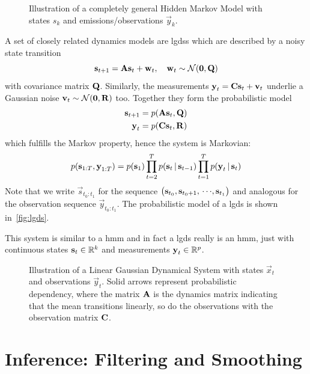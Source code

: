 	\begin{figure}
		\centering
		\tikzHiddenMarkovModel
		\caption{Illustration of a completely general Hidden Markov Model with states \(s_k\) and emis\-sions/observations \(\vec{y}_k\).}
		\label{fig:hiddenMarkovModel}
	\end{figure}

	A set of closely related dynamics models are \acp{lgds} which are described by a noisy state transition
	\begin{equation*}
		\boldsymbol{\mathrm{s}}_{t + 1} = \boldsymbol{\mathrm{A}} \boldsymbol{\mathrm{s}}_t + \boldsymbol{\mathrm{w}}_t,\quad \boldsymbol{\mathrm{w}}_t \sim \mathcal{N}(\boldsymbol{\mathrm{0}}, \boldsymbol{\mathrm{Q}})
	\end{equation*}
	with covariance matrix \(\boldsymbol{\mathrm{Q}}\). Similarly, the measurements \( \boldsymbol{\mathrm{y}}_t = \boldsymbol{\mathrm{C}} \boldsymbol{\mathrm{s}}_t + \boldsymbol{\mathrm{v}}_t \) underlie a Gaussian noise \( \boldsymbol{\mathrm{v}}_t \sim \mathcal{N}(\boldsymbol{\mathrm{0}}, \boldsymbol{\mathrm{R}}) \) too. Together they form the probabilistic model
	\begin{align*}
		\boldsymbol{\mathrm{s}}_{t + 1} &= p(\boldsymbol{\mathrm{A}} \boldsymbol{\mathrm{s}}_t, \boldsymbol{\mathrm{Q}}) \\
		\boldsymbol{\mathrm{y}}_t &= p(\boldsymbol{\mathrm{C}} \boldsymbol{\mathrm{s}}_t, \boldsymbol{\mathrm{R}})
	\end{align*}
	which fulfills the Markov property, hence the system is Markovian:
	\begin{equation*}
		p(\boldsymbol{\mathrm{s}}_{1:T}, \boldsymbol{\mathrm{y}}_{1:T}) = p(\boldsymbol{\mathrm{s}}_1) \prod_{t = 2}^{T} p(\boldsymbol{\mathrm{s}}_t \,\vert\, \boldsymbol{\mathrm{s}}_{t - 1}) \prod_{t = 1}^{T} p(\boldsymbol{\mathrm{y}}_t \,\vert\, \boldsymbol{\mathrm{s}}_t)
	\end{equation*}
	Note that we write \( \vec{s}_{t_0:t_1} \) for the sequence \( \big( \boldsymbol{\mathrm{s}}_{t_0}, \boldsymbol{\mathrm{s}}_{t_0 + 1}, \,\cdots\!, \boldsymbol{\mathrm{s}}_{t_1} \big) \) and analogous for the observation sequence \( \vec{y}_{t_0:t_1} \). The probabilistic model of a \ac{lgds} is shown in~\autoref{fig:lgds}.

	This system is similar to a \ac{hmm} and in fact a \ac{lgds} really is an \ac{hmm}, just with continuous states \( \boldsymbol{\mathrm{s}}_t \in \mathbb{R}^k \) and measurements \( \boldsymbol{\mathrm{y}}_t \in \mathbb{R}^p \).

	\begin{figure}
		\centering
		\tikzLinearGaussianDynamicalSystem
		\caption{Illustration of a Linear Gaussian Dynamical System with states \(\vec{x}_t\) and observations \(\vec{y}_t\). Solid arrows represent probabilistic dependency, where the matrix \(\boldsymbol{\mathrm{A}}\) is the dynamics matrix indicating that the mean transitions linearly, so do the observations with the observation matrix \(\boldsymbol{\mathrm{C}}\).}
		\label{fig:lgds}
	\end{figure}

\section{Inference: Filtering and Smoothing}
	\label{sec:filteringSmoothing}

